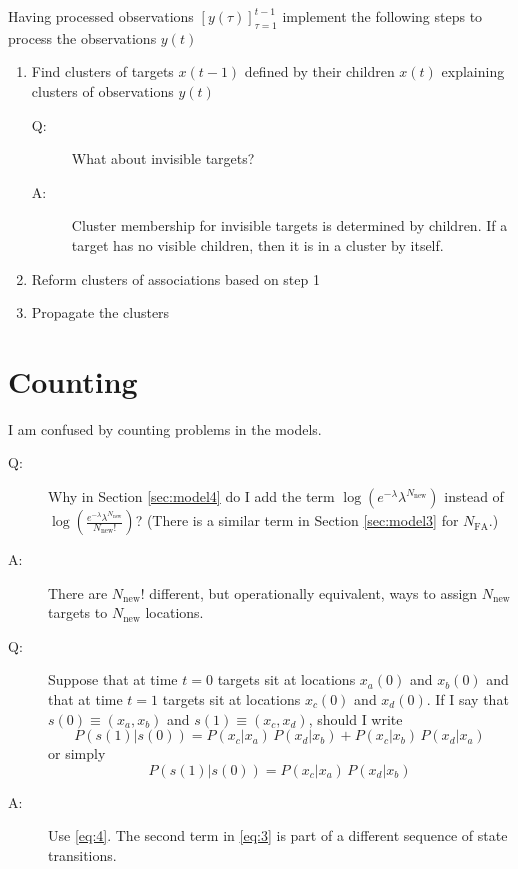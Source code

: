 \documentclass[12pt]{article}
\newcommand{\os}[4]{{\left[ #1(#2) \right]}_{#3}^{#4}} %
\newcommand{\ti}[2]{{#1}{(#2)}}                         %
\newcommand{\ts}[4]{\os{#1}{#2}{#2=#3}{#4}} %
\begin{document}
Having processed observations $\ts{y}{\tau}{1}{t-1}$ implement the
following steps to process the observations $\ti{y}{t}$
\begin{enumerate}
\item Find clusters of targets $\ti{x}{t-1}$ defined by their children
  $\ti{x}{t}$ explaining clusters of observations $\ti{y}{t}$
  \begin{description}
  \item[Q:] What about invisible targets?
  \item[A:] Cluster membership for invisible targets is determined by
    children.  If a target has no visible children, then it is in a
    cluster by itself.
  \end{description}
\item Reform clusters of associations based on step 1
\item Propagate the clusters
\end{enumerate}

\appendix
\section{Counting}
\label{sec:counting}

I am confused by counting problems in the models.
\begin{description}
\item[Q:] Why in Section \ref{sec:model4} do I add the term $\log
  \left( e^{-\lambda} \lambda^{N_{\text{new}}} \right)$ instead of
  $\log \left(
    \frac{e^{-\lambda}\lambda^{N_{\text{new}}}}{N_{\text{new}}!}\right)$?
  (There is a similar term in Section \ref{sec:model3} for
  $N_{\text{FA}}$.)
\item[A:] There are $N_{\text{new}}!$ different, but operationally
  equivalent, ways to assign $N_{\text{new}}$ targets to
  $N_{\text{new}}$ locations.
\item[Q:] Suppose that at time $t=0$ targets sit at locations
  $\ti{x_a}{0}$ and $\ti{x_b}{0}$ and that at time $t=1$ targets sit
  at locations $\ti{x_c}{0}$ and $\ti{x_d}{0}$.  If I say that
  $\ti{s}{0}\equiv \left(x_a,x_b \right)$ and $\ti{s}{1}\equiv
  \left(x_c,x_d \right)$, should I write
  \begin{equation}
    \label{eq:3}
    P(\ti{s}{1}|\ti{s}{0}) =  P(x_c|x_a) \,  P(x_d|x_b) +  P(x_c|x_b)
    \,  P(x_d|x_a)
  \end{equation}
  or simply
  \begin{equation}
    \label{eq:4}
    P(\ti{s}{1}|\ti{s}{0}) =  P(x_c|x_a) \,  P(x_d|x_b)
  \end{equation}
\item[A:] Use \eqref{eq:4}.  The second term in \eqref{eq:3} is part
  of a different sequence of state transitions.
\end{description}
\end{document}
